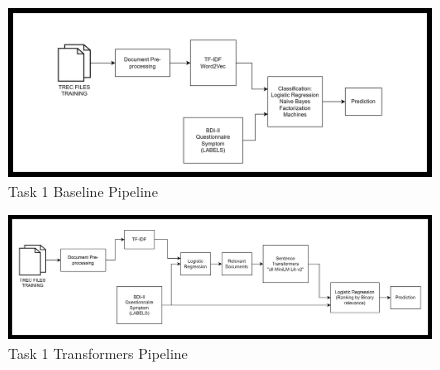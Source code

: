 \documentclass[]{style/ceurart}
\begin{document}

\begin{figure}[h]
\centering
\includegraphics[width=\textwidth]{t1basepipeline.png}
\caption{Task 1 Baseline Pipeline}
\label{fig:example}
\end{figure}


\begin{figure}[h]
\centering
\includegraphics[width=\textwidth]{t1transformerspipeline.png}
\caption{Task 1 Transformers Pipeline}
\label{fig:example}
\end{figure}
\end{document}
